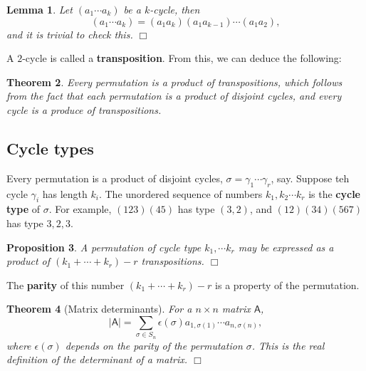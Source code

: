 \documentclass[letter-paper]{tufte-book}
\newtheorem{theorem}{\color{pastel-blue}Theorem}[section]
\newtheorem{lemma}[theorem]{\color{pastel-blue}Lemma}
\newtheorem{proposition}[theorem]{\color{pastel-blue}Proposition}
\newcommand\Def[1]{\textbf{#1}}
\newcommand{\qedwhite}{\hfill \ensuremath{\Box}}
\begin{document}
\begin{lemma}
  Let $(a_1\cdots a_k)$ be a $k$-cycle, then
  \begin{equation*}
    (a_1\cdots a_k) = (a_1 a_k)(a_1 a_{k-1})\cdots(a_1 a_2),
  \end{equation*}
  and it is trivial to check this. \qedwhite
\end{lemma}
A $2$-cycle is called a \Def{transposition}. From this, we can deduce
the following:
\begin{theorem}
  Every permutation is a product of transpositions, which follows from the fact 
  that each permutation is a product of disjoint cycles, and every cycle is a 
  produce of transpositions.
\end{theorem}


\subsection{Cycle types}

Every permutation is a product of disjoint cycles,
$\sigma=\gamma_1\cdots\gamma_r$, say. Suppose teh cycle $\gamma_i$ has
length $k_i$. The unordered sequence of numbers $k_1,k_2\cdots k_r$ is the
\Def{cycle type} of $\sigma$. For example, $(123)(45)$ has type $(3,2)$,
and $(12)(34)(567)$ has type $3,2,3$.
\begin{proposition}
  A permutation of cycle type $k_1,\cdots k_r$ may be expressed as a product of 
  $(k_1+\cdots+k_r)-r$ transpositions. \qedwhite
\end{proposition}
The \Def{parity} of this number $(k_1+\cdots+k_r)-r$ is a property of the 
permutation.
\begin{theorem}[Matrix determinants]
  For a $n\times n$ matrix $\mathsf{A}$,
  \begin{equation*}
    |\mathsf{A}|=\sum_{\sigma\in S_{n}}\epsilon(\sigma)a_{1,\sigma(1)}\cdots
    a_{n,\sigma(n)},
  \end{equation*}
  where $\epsilon(\sigma)$ depends on the parity of the permutation $\sigma$. 
  This is the real definition of the determinant of a matrix. \qedwhite
\end{theorem}
\end{document}
